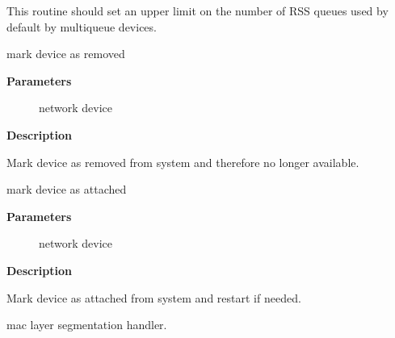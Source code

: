 \documentclass[a4paper,8pt,english]{sphinxmanual}
\begin{document}
This routine should set an upper limit on the number of RSS queues
used by default by multiqueue devices.

\begin{fulllineitems}
\label{networking/kapi:c.netif_device_detach}
mark device as removed

\end{fulllineitems}


\textbf{Parameters}
\begin{description}
\item[{}] \leavevmode
network device

\end{description}

\textbf{Description}

Mark device as removed from system and therefore no longer available.

\begin{fulllineitems}
\label{networking/kapi:c.netif_device_attach}
mark device as attached

\end{fulllineitems}


\textbf{Parameters}
\begin{description}
\item[{}] \leavevmode
network device

\end{description}

\textbf{Description}

Mark device as attached from system and restart if needed.

\begin{fulllineitems}
\label{networking/kapi:c.skb_mac_gso_segment}
mac layer segmentation handler.

\end{fulllineitems}
\end{document}
